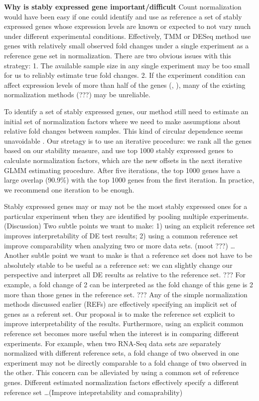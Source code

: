 \documentclass[11pt, a4paper]{article}
\begin{document}
\textbf{Why is stably expressed gene important/difficult} Count normalization would have been easy if one could identify and use as reference a set of stably expressed genes whose expression levels are known or expected to not vary much under different experimental conditions.  Effectively, TMM or DESeq method use genes with relatively small observed fold changes under a single experiment as a reference gene set in normalization. There are two obvious issues with this strategy: 1. The available sample size in any single experiment may be too small for us to reliably estimate true fold changes. 2. If the experiment condition can affect expression levels of more than half of the genes (\cite{loven2012revisiting}, \cite{wu2013use}), many of the existing normalization methods (???) may be unreliable.  


To identify a set of stably expressed genes, our method still need to estimate an initial set of normalization factors where we need to make assumptions about relative fold changes between samples. This kind of circular dependence seems unavoidable \citep{vandesompele2002accurate}. Our stretagy is to use an iterative procedure: we rank all the genes based on our stability measure, and use top 1000 stably expressed genes to calculate normalization factors, which are the new offsets in the next iterative GLMM estimating procedure. After five iterations, the top 1000 genes have a large overlap (90.9\%) with the top 1000 genes from the first iteration. In practice, we recommend one iteration to be enough.  


Stably expressed genes may or may not be the most stably expressed ones for a
particular experiment when they are identified by pooling multiple
experiments. (Discussion) Two subtle points we want to make: 1) using an explicit reference set improves interpretability of DE test results; 2) using a common reference
set improve comparability when analyzing two or more data sets. (moot ???)
\dots Another subtle point we want to make is that a reference set does not
have to be absolutely stable to be useful as a reference set: we can slightly
change our perspective and interpret all DE results as relative to the
reference set.  ??? For example, a fold change of 2 can be interpreted as the
fold change of this gene is 2 more than those genes in the reference set. ???
Any of the simple normalization methods discussed earlier (REFs) are
effectively specifying an implicit set of genes as a referent set. Our
proposal is to make the reference set explicit to improve interpretability of
the results.  Furthermore, using an explicit common reference set becomes more
useful when the interest is in comparing different experiments. For example,
when two RNA-Seq data sets are separately normalized with different reference
sets, a fold change of two observed in one experiment may not be directly
comparable to a fold change of two observed in the other.  This concern can be
alleviated by using a common set of reference genes.
Different estimated normalization factors effectively specify a different
reference set \ldots (Improve intepretability and comaprability)
\end{document}

